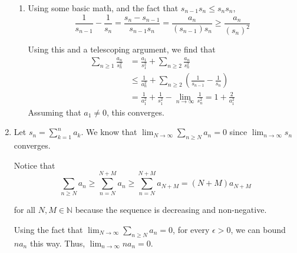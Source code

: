 \documentclass[12pt]{article}
\begin{document}
\begin{enumerate}[start=1,label={\bfseries Problem \arabic*:},leftmargin=1in]
\begin{enumerate}
        \item Using some basic math, and the fact that $s_{n-1}s_{n} \leq s_{n}s_{n}$, 
        \[
        \frac{1}{s_{n-1}} - \frac{1}{s_{n}} = \frac{s_{n}- s_{n-1}}{s_{n-1}s_{n}} = \frac{a_{n}}{(s_{n-1})s_{n}} \geq \frac{a_{n}}{(s_{n})^{2}}
        \] 

        Using this and a telescoping argument, we find that 
        \begin{align*}
            \sum_{n\geq 1} \frac{a_{n}}{s_{n}^2} &= \frac{a_{1}}{s_{1}^{2}} + \sum_{n \geq 2} \frac{a_{n}}{s_{n}^2}\\
            &\leq \frac{1}{a_{n}^2} + \sum_{n\geq 2} (\frac{1}{s_{n-1}} - \frac{1}{s_{n}}) \\ 
            &= \frac{1}{a_{1}^2} + \frac{1}{s_{1}^{2}} - \lim_{n \to \infty} \frac{1}{s_{n}^{2}} = 1 + \frac{2}{a_{1}^{2}}
        \end{align*}
        Assuming that $a_{1} \neq 0$, this converges. 
    \end{enumerate}

    \item Let $s_{n} = \sum_{k=1}^n a_{k}$. We know that $\lim_{N \to \infty}\sum_{n\geq N} a_{n}= 0$ since $\lim_{n \to \infty} s_{n}$ converges. 
    
   Notice that \[ \sum_{n \geq N} a_{n} \geq  \sum_{n = N}^{N+M} a_n \geq \sum_{n = N}^{N+M} a_{N+M } = (N+M)a_{N+M}\]

   for all $N, M \in \mathbb{N}$ because the sequence is decreasing and non-negative. 
    
   Using the fact that $\lim_{N \to \infty}\sum_{n \geq N} a_{n} = 0$, for every $\epsilon > 0$, we can bound $na_{n}$ this way. Thus, $\lim_{n \to \infty}na_{n} = 0$. 
\end{enumerate}
\end{document}
